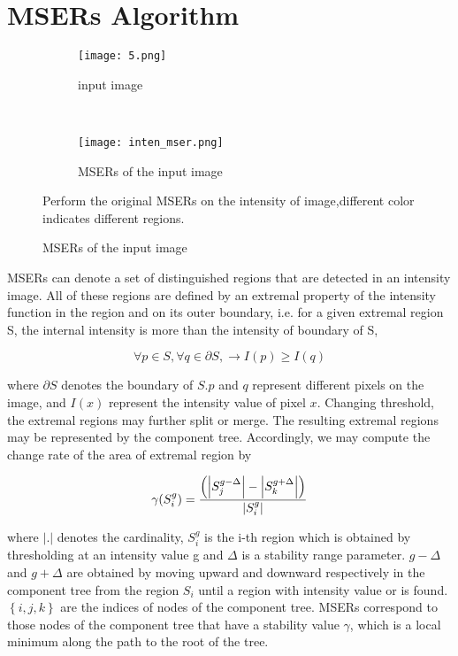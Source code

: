 \section{MSERs Algorithm}

\begin{figure}[H]
	\centering
	\begin{subfigure}[b]{0.4\textwidth}
		\centering
		\texttt{[image: 5.png]}
		\caption{input image}
	\end{subfigure}
	~  
	\begin{subfigure}[b]{0.4\textwidth}
		\centering
		\texttt{[image: inten\_mser.png]}
		\caption{MSERs of the input image}	
	\end{subfigure}
	\label{modifi_mser}
	
	Perform the original MSERs on the intensity of image,different color indicates different regions.
\end{figure}


MSERs can denote a set of distinguished regions that are detected in an intensity image. All of these regions are defined by an extremal property of the intensity function in the region and on its outer boundary, i.e. for a given extremal region S, the internal intensity is more than the intensity of boundary of S,

\[ \forall p \in S,\forall q \in \partial S , \longrightarrow I(p) \geq I(q)\]

where $\partial S $ denotes the boundary of $S$.$p$ and $q$ represent different pixels on the image, and $I(x)$ represent the intensity value of pixel $x$. 
Changing threshold, the extremal regions may further split or merge. The resulting extremal regions may be represented by the component tree. Accordingly, we may compute the change rate of the area of extremal region by

\[ \gamma(S_i^g) = \frac{\left ( \left |  S_j^{g-\Delta} \right |-\left |  S_k^{g+\Delta} \right | \right )}{\arrowvert S_i^g\arrowvert} \]

where $ \left | .  \right |$  denotes the cardinality, $ S_{i}^{g} $  is the i-th region which is obtained by thresholding at an intensity value g and $\Delta $ is a stability range parameter. $  g-\Delta $ and $ g+\Delta $ are obtained by moving upward and downward respectively in the component tree from the region $ S_{i} $ until a region with intensity value   or  is found. $ \left \{ i,j,k \right \}$ are the indices of nodes of the component tree. MSERs correspond to those nodes of the component tree that have a stability value $\gamma$, which is a local minimum along the path to the root of the tree.



